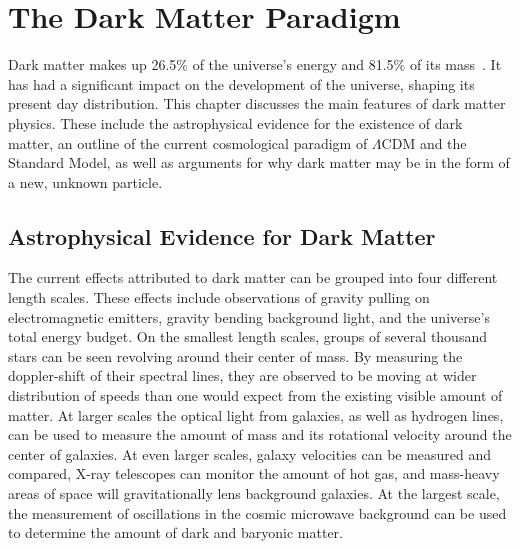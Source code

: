 \cleartooddpage[\thispagestyle{empty}]
\newcommand{\thetamc}{\theta_{\textrm{MC}}}
\newcommand{\mlratio}{$\left [ \frac{M_\odot}{L_\odot} \right ]$}
\chapter{The Dark Matter Paradigm}\label{ch_dm}

Dark matter makes up 26.5\% of the universe's energy and 81.5\% of its mass~\cite{planck2015}.
It has had a significant impact on the development of the universe, shaping its present day distribution.
This chapter discusses the main features of dark matter physics.
These include the astrophysical evidence for the existence of dark matter, an outline of the current cosmological paradigm of $\Lambda$CDM and the Standard Model, as well as arguments for why dark matter may be in the form of a new, unknown particle.


\section{Astrophysical Evidence for Dark Matter}
  
The current effects attributed to dark matter can be grouped into four different length scales.
These effects include observations of gravity pulling on electromagnetic emitters, gravity bending background light, and the universe's total energy budget.
On the smallest length scales, groups of several thousand stars can be seen revolving around their center of mass.
By measuring the doppler-shift of their spectral lines, they are observed to be moving at wider distribution of speeds than one would expect from the existing visible amount of matter.
At larger scales the optical light from galaxies, as well as hydrogen lines, can be used to measure the amount of mass and its rotational velocity around the center of galaxies.
At even larger scales, galaxy velocities can be measured and compared, X-ray telescopes can monitor the amount of hot gas, and mass-heavy areas of space will gravitationally lens background galaxies.
At the largest scale, the measurement of oscillations in the cosmic microwave background can be used to determine the amount of dark and baryonic matter.


